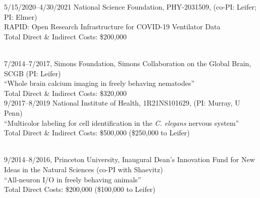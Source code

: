 \documentclass[11pt]{article}
\begin{document}
5/15/2020--4/30/2021 National Science Foundation, PHY-2031509, (co-PI: Leifer; PI: Elmer)\\
RAPID: Open Research Infrastructure for COVID-19 Ventilator Data\\
Total Direct \& Indirect Costs: \$200,000\\\ 


7/2014--7/2017, Simons Foundation, Simons Collaboration on the Global Brain, SCGB  (PI: Leifer) \\
``Whole brain calcium imaging in freely behaving nematodes''\\
Total Direct \& Indirect Costs: \$320,000\\

9/2017--8/2019  National Institute of Health, 1R21NS101629, (PI: Murray, U Penn)\\
``Multicolor labeling for cell identification in the \textit{C. elegans} nervous system''\\ 
Total Direct \& Indirect Costs: \$500,000  (\$250,000 to Leifer) \\\

9/2014--8/2016, Princeton University, Inaugural Dean's Innovation Fund for New Ideas in the Natural Sciences (co-PI with Shaevitz)\\
``All-neuron I/O in freely behaving animals''\\
Total Direct Costs: \$200,000 (\$100,000 to Leifer) \\
\end{document}
